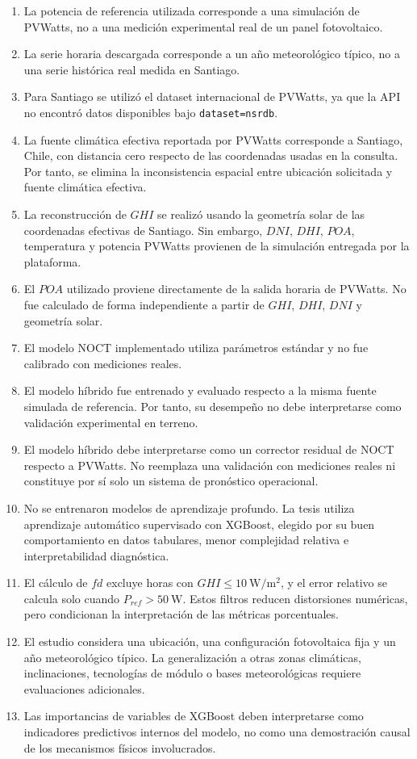 \documentclass[12pt, letterpaper]{article}
\begin{document}
\begin{enumerate}
    \item La potencia de referencia utilizada corresponde a una simulaci\'on de PVWatts, no a una medici\'on experimental real de un panel fotovoltaico.
    \item La serie horaria descargada corresponde a un a\~no meteorol\'ogico t\'ipico, no a una serie hist\'orica real medida en Santiago.
    \item Para Santiago se utiliz\'o el dataset internacional de PVWatts, ya que la API no encontr\'o datos disponibles bajo \texttt{dataset=nsrdb}.
    \item La fuente clim\'atica efectiva reportada por PVWatts corresponde a Santiago, Chile, con distancia cero respecto de las coordenadas usadas en la consulta. Por tanto, se elimina la inconsistencia espacial entre ubicaci\'on solicitada y fuente clim\'atica efectiva.
    \item La reconstrucci\'on de \(GHI\) se realiz\'o usando la geometr\'ia solar de las coordenadas efectivas de Santiago. Sin embargo, \(DNI\), \(DHI\), \(POA\), temperatura y potencia PVWatts provienen de la simulaci\'on entregada por la plataforma.
    \item El \(POA\) utilizado proviene directamente de la salida horaria de PVWatts. No fue calculado de forma independiente a partir de \(GHI\), \(DHI\), \(DNI\) y geometr\'ia solar.
    \item El modelo NOCT implementado utiliza par\'ametros est\'andar y no fue calibrado con mediciones reales.
    \item El modelo h\'ibrido fue entrenado y evaluado respecto a la misma fuente simulada de referencia. Por tanto, su desempe\~no no debe interpretarse como validaci\'on experimental en terreno.
    \item El modelo h\'ibrido debe interpretarse como un corrector residual de NOCT respecto a PVWatts. No reemplaza una validaci\'on con mediciones reales ni constituye por s\'i solo un sistema de pron\'ostico operacional.
    \item No se entrenaron modelos de aprendizaje profundo. La tesis utiliza aprendizaje autom\'atico supervisado con XGBoost, elegido por su buen comportamiento en datos tabulares, menor complejidad relativa e interpretabilidad diagn\'ostica.
    \item El c\'alculo de \(fd\) excluye horas con \(GHI \leq \SI{10}{\watt\per\square\meter}\), y el error relativo se calcula solo cuando \(P_{ref} > \SI{50}{\watt}\). Estos filtros reducen distorsiones num\'ericas, pero condicionan la interpretaci\'on de las m\'etricas porcentuales.
    \item El estudio considera una ubicaci\'on, una configuraci\'on fotovoltaica fija y un a\~no meteorol\'ogico t\'ipico. La generalizaci\'on a otras zonas clim\'aticas, inclinaciones, tecnolog\'ias de m\'odulo o bases meteorol\'ogicas requiere evaluaciones adicionales.
    \item Las importancias de variables de XGBoost deben interpretarse como indicadores predictivos internos del modelo, no como una demostraci\'on causal de los mecanismos f\'isicos involucrados.
\end{enumerate}
\end{document}
